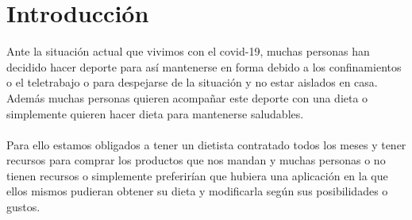\chapter{Introducción}

Ante la situación actual que vivimos con el covid-19, muchas personas han decidido 
hacer deporte para así mantenerse en forma debido a los confinamientos
o el teletrabajo o para despejarse de la situación y no estar aislados en casa. 
Además muchas personas quieren acompañar este deporte con una dieta o simplemente quieren hacer 
dieta para mantenerse saludables.
\\\\
Para ello estamos obligados a tener un dietista contratado todos los meses y tener recursos para 
comprar los productos que nos mandan y muchas personas o no tienen recursos o simplemente preferirían
que hubiera una aplicación en la que ellos mismos pudieran obtener su dieta y modificarla según sus 
posibilidades o gustos.
\\\\


